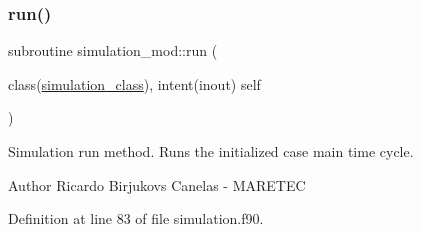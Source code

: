 \subsubsection{\texorpdfstring{run()}{run()}}
{\footnotesize\ttfamily subroutine simulation\+\_\+mod\+::run (\begin{DoxyParamCaption}\item[{class(\mbox{\hyperlink{structsimulation__mod_1_1simulation__class}{simulation\+\_\+class}}), intent(inout)}]{self }\end{DoxyParamCaption})\hspace{0.3cm}{\ttfamily [private]}}



Simulation run method. Runs the initialized case main time cycle. 

\begin{DoxyAuthor}{Author}
Ricardo Birjukovs Canelas -\/ M\+A\+R\+E\+T\+EC 
\end{DoxyAuthor}


Definition at line 83 of file simulation.\+f90.


